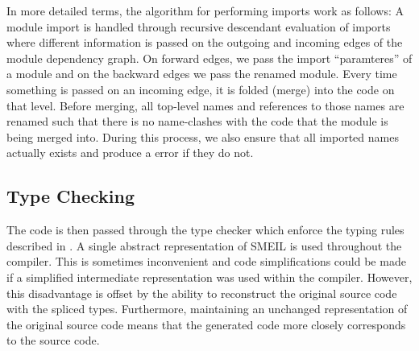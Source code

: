In more detailed terms, the algorithm for performing imports work as
follows: A
module import is handled through recursive descendant evaluation of imports
where different information is passed on the outgoing and incoming edges of the
module dependency graph. On forward edges, we pass the import
``paramteres'' of a module and on the backward edges we pass the renamed
module. Every time something is passed on an incoming edge, it is folded (merge)
into the code on that level. Before merging, all top-level names and references
to those names are renamed such that there is no name-clashes with the code that
the module is being merged into. During this process, we also ensure that all
imported names actually exists and produce a error if they do not.



\subsection{Type Checking} The code is then passed through the type checker
which enforce the typing rules described in . A single
abstract representation of SMEIL is used throughout the compiler. This is
sometimes inconvenient and code simplifications could be made if a simplified
intermediate representation was used within the compiler. However, this
disadvantage is offset by the ability to reconstruct the original source code
with the spliced types. Furthermore, maintaining an unchanged representation of
the original source code means that the generated code more closely corresponds
to the source code.

